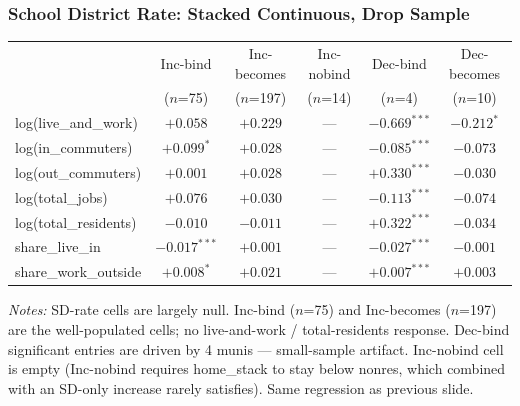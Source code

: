\documentclass[xcolor = x11names, compress, aspectratio = 169]{beamer}
\begin{document}
    \begin{frame}
    \frametitle{School District Rate: Stacked Continuous, Drop Sample}
        \centering
        \scriptsize
        \renewcommand{\arraystretch}{1.10}
        \setlength{\tabcolsep}{4pt}
        \begin{tabular}{lccccc}
            \toprule
            & Inc-bind & Inc-becomes & Inc-nobind & Dec-bind & Dec-becomes \\
            & ($n$=75) & ($n$=197) & ($n$=14) & ($n$=4) & ($n$=10) \\
            \midrule
            log(live\_and\_work)    & $+0.058$         & $+0.229$       & ---            & $\bm{-0.669^{***}}$ & $-0.212^{*}$ \\
            log(in\_commuters)      & $+0.099^{*}$     & $+0.028$       & ---            & $\bm{-0.085^{***}}$ & $-0.073$ \\
            log(out\_commuters)     & $+0.001$         & $+0.028$       & ---            & $\bm{+0.330^{***}}$ & $-0.030$ \\
            log(total\_jobs)        & $+0.076$         & $+0.030$       & ---            & $\bm{-0.113^{***}}$ & $-0.074$ \\
            log(total\_residents)   & $-0.010$         & $-0.011$       & ---            & $\bm{+0.322^{***}}$ & $-0.034$ \\
            share\_live\_in         & $\bm{-0.017^{***}}$ & $+0.001$    & ---            & $\bm{-0.027^{***}}$ & $-0.001$ \\
            share\_work\_outside    & $+0.008^{*}$     & $+0.021$       & ---            & $\bm{+0.007^{***}}$ & $+0.003$ \\
            \bottomrule
        \end{tabular}
        \vspace{0.10cm}
        \begin{minipage}{0.95\textwidth}
            \tiny \textit{Notes:} SD-rate cells are largely null. Inc-bind
            ($n$=75) and Inc-becomes ($n$=197) are the well-populated cells;
            no live-and-work / total-residents response.
            Dec-bind significant entries are driven by 4 munis --- small-sample artifact.
            Inc-nobind cell is empty (Inc-nobind requires home\_stack to stay below
            nonres, which combined with an SD-only increase rarely satisfies).
            Same regression as previous slide.
        \end{minipage}
    \end{frame}
\end{document}
